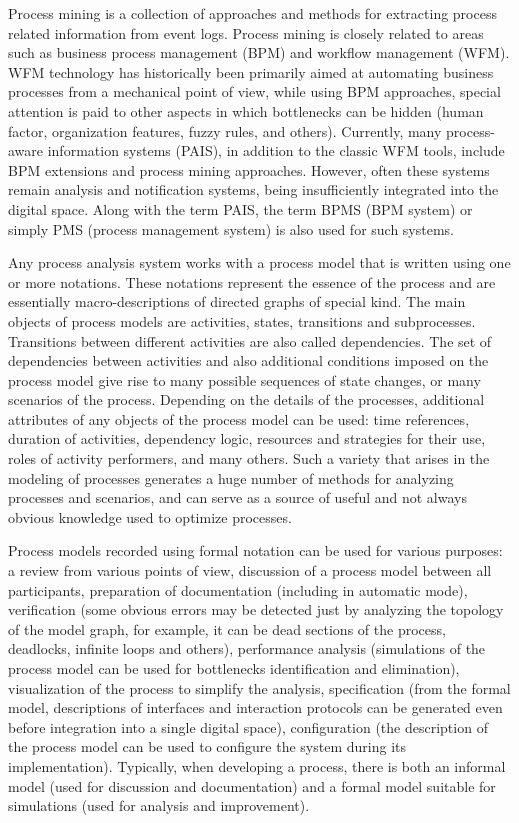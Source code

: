 \documentclass[
11pt,%
tightenlines,%
twoside,%
onecolumn,%
nofloats,%
nobibnotes,%
nofootinbib,%
superscriptaddress,%
noshowpacs,%
centertags]%
{revtex4}
\begin{document}
Process mining is a collection of approaches and methods for extracting process related information from event logs.
Process mining is closely related to areas such as business process management (BPM) and workflow management (WFM).
WFM technology has historically been primarily aimed at automating business processes from a mechanical point of view, while using BPM approaches, special attention is paid to other aspects in which bottlenecks can be hidden (human factor, organization features, fuzzy rules, and others).
Currently, many process-aware information systems (PAIS), in addition to the classic WFM tools, include BPM extensions and process mining approaches.
However, often these systems remain analysis and notification systems, being insufficiently integrated into the digital space.
Along with the term PAIS, the term BPMS (BPM system) or simply PMS (process management system) is also used for such systems.

Any process analysis system works with a process model that is written using one or more notations.
These notations represent the essence of the process and are essentially macro-descriptions of directed graphs of special kind.
The main objects of process models are activities, states, transitions and subprocesses.
Transitions between different activities are also called dependencies.
The set of dependencies between activities and also additional conditions imposed on the process model give rise to many possible sequences of state changes, or many scenarios of the process.
Depending on the details of the processes, additional attributes of any objects of the process model can be used: time references, duration of activities, dependency logic, resources and strategies for their use, roles of activity performers, and many others.
Such a variety that arises in the modeling of processes generates a huge number of methods for analyzing processes and scenarios, and can serve as a source of useful and not always obvious knowledge used to optimize processes.

Process models recorded using formal notation can be used for various purposes: a review from various points of view, discussion of a process model between all participants, preparation of documentation (including in automatic mode), verification (some obvious errors may be detected just by analyzing the topology of the model graph, for example, it can be dead sections of the process, deadlocks, infinite loops and others), performance analysis (simulations of the process model can be used for bottlenecks identification and elimination), visualization of the process to simplify the analysis, specification (from the formal model, descriptions of interfaces and interaction protocols can be generated even before integration into a single digital space), configuration (the description of the process model can be used to configure the system during its implementation).
Typically, when developing a process, there is both an informal model (used for discussion and documentation) and a formal model suitable for simulations (used for analysis and improvement). 
\end{document}
